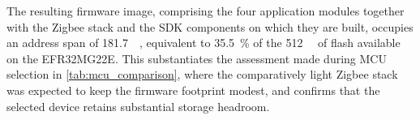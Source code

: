 The resulting firmware image, comprising the four application modules together with the Zigbee stack and the SDK components on which they are built, occupies an address span of \SI{181.7}{\kilo\byte}, equivalent to \SI{35.5}{\percent} of the \SI{512}{\kilo\byte} of flash available on the EFR32MG22E. This substantiates the assessment made during MCU selection in \cref{tab:mcu_comparison}, where the comparatively light Zigbee stack was expected to keep the firmware footprint modest, and confirms that the selected device retains substantial storage headroom.
